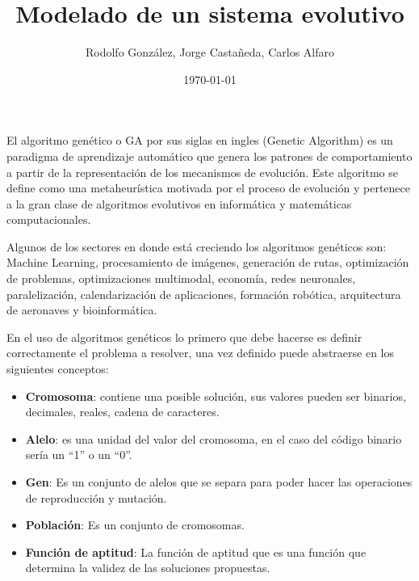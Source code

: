 \documentclass[10pt,twocolumn,a4paper]{articuloAPA}
\author{Rodolfo González, Jorge Castañeda, Carlos Alfaro}
\title{Modelado de un sistema evolutivo}%
\date{\today}
\begin{document}

El algoritmo genético o GA por sus siglas en ingles (Genetic Algorithm) es un paradigma de aprendizaje automático que genera los patrones de comportamiento a partir de la representación de los mecanismos de evolución. Este algoritmo se define como una metaheurística motivada por el proceso de evolución y pertenece a la gran clase de algoritmos evolutivos en informática y matemáticas computacionales.

Algunos de los sectores en donde está creciendo los algoritmos genéticos son: Machine Learning, procesamiento de imágenes, generación de rutas, optimización de problemas, optimizaciones multimodal, economía, redes neuronales, paralelización, calendarización de aplicaciones, formación robótica, arquitectura de aeronaves y bioinformática.

En el uso de algoritmos genéticos lo primero que debe hacerse es definir correctamente el problema a resolver, una vez definido puede abstraerse en los siguientes conceptos:

\begin{itemize}
  \item \textbf{Cromosoma}: contiene una posible solución, sus valores pueden ser binarios, decimales, reales, cadena de caracteres.
  \item \textbf{Alelo}: es una unidad del valor del cromosoma, en el caso del código binario sería un ``1'' o un ``0''.
  \item \textbf{Gen}: Es un conjunto de alelos que se separa para poder hacer las operaciones de reproducción y mutación.
  \item \textbf{Población}: Es un conjunto de cromosomas.
  \item \textbf{Función de aptitud}: La función de aptitud que es una función que determina la validez de las soluciones propuestas.
\end{itemize} 
\end{document}
